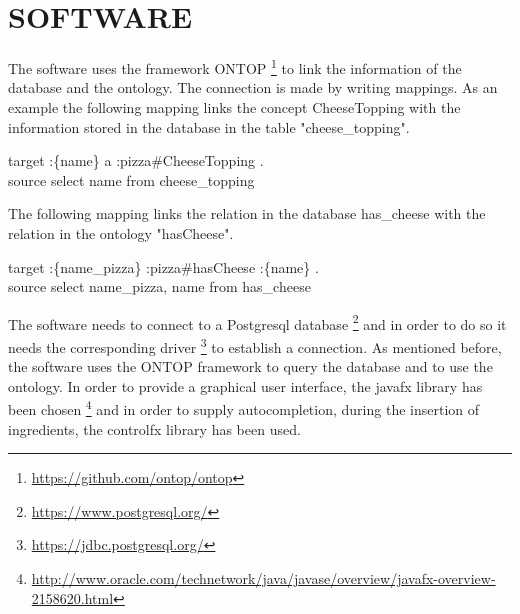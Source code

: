 \documentclass[10pt,a4paper]{article}
\begin{document}
\section{SOFTWARE}
The software uses the framework ONTOP \footnote{\url{https://github.com/ontop/ontop}} to link the information of the database and the ontology. The connection is made by writing mappings. As an example the following mapping links the concept CheeseTopping with the information stored in the database in the table "cheese\_topping".
\begin{center}
target		:\{name\} a :pizza\#{CheeseTopping} .  \\
source		select name from cheese\_topping
\end{center}

The following mapping links the relation in the database has\_cheese with the relation in the ontology "hasCheese".
\begin{center}
target		:\{name\_pizza\} :pizza\#{hasCheese} :\{name\} .  \\
source		select name\_pizza, name from has\_cheese
\end{center}

The software needs to connect to a Postgresql database \footnote{\url{https://www.postgresql.org/}} and in order to do so it needs the corresponding driver \footnote{\url{https://jdbc.postgresql.org/}} to establish a connection. As mentioned before, the software uses the ONTOP framework to query the database and to use the ontology. In order to provide a graphical user interface, the javafx library has been chosen \footnote{\url{http://www.oracle.com/technetwork/java/javase/overview/javafx-overview-2158620.html}} and in order to supply autocompletion, during the insertion of ingredients, the controlfx library has been used.
\end{document}
